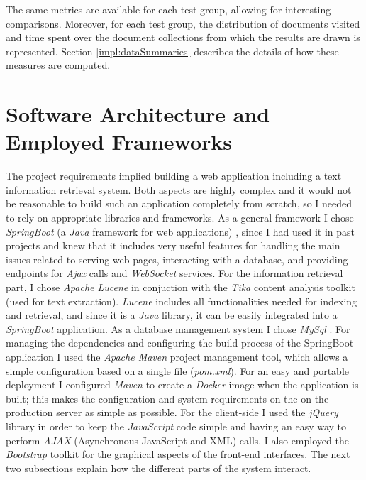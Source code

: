 \documentclass[a4paper]{usiinfbachelorproject}
\begin{document}
The same metrics are available for each test group, allowing for interesting comparisons. Moreover, for each test group, the distribution
of documents visited and time spent over the document collections from which the results are drawn is represented.
Section \ref{impl:dataSummaries} describes the details of how these measures are computed.

\newpage

\section{\textbf{Software Architecture and Employed Frameworks}} \label{sec:arch}

The project requirements implied building a web application including a text information retrieval system. Both aspects are highly complex and it would not be reasonable to build such an application completely from scratch, so I
needed to rely on appropriate libraries and frameworks. As a general framework I chose \emph{SpringBoot} 
(a \emph{Java} framework for web applications) \cite{springBootHome}, since
I had used it in past projects and knew that it includes very useful features for handling the main issues related to
serving web pages, interacting with a database, and providing endpoints for \emph{Ajax} calls and \emph{WebSocket} services.
For the information retrieval part, I chose \emph{Apache Lucene} \cite{luceneHome} in conjuction with the \emph{Tika} content analysis toolkit \cite{tikaHome}
(used for text extraction). \emph{Lucene} includes all functionalities needed for indexing and retrieval,
and since it is a \emph{Java} library, it can be easily integrated into a \emph{SpringBoot} application. As a database management system
I chose \emph{MySql} \cite{MySQLhome}.
For managing the dependencies and configuring the build process of the SpringBoot application I used the \emph{Apache Maven}
project management tool, which allows a simple configuration based on a single file (\emph{pom.xml}).
For an easy and portable deployment I configured \emph{Maven} to create a \emph{Docker} \cite{dockerHome} image when the application is built;
this makes the configuration and system requirements on the on the production server as simple as possible.  
For the client-side I used the \emph{jQuery}\cite{jQueryHome} library in order to keep the \emph{JavaScript} code simple
and having an easy way to perform \emph{AJAX} (Asynchronous JavaScript and XML) calls. I also employed the
\emph{Bootstrap} \cite{bootstrapHome} toolkit for the graphical aspects of the front-end interfaces.
The next two subsections explain how the different parts of the system interact.
\end{document}
